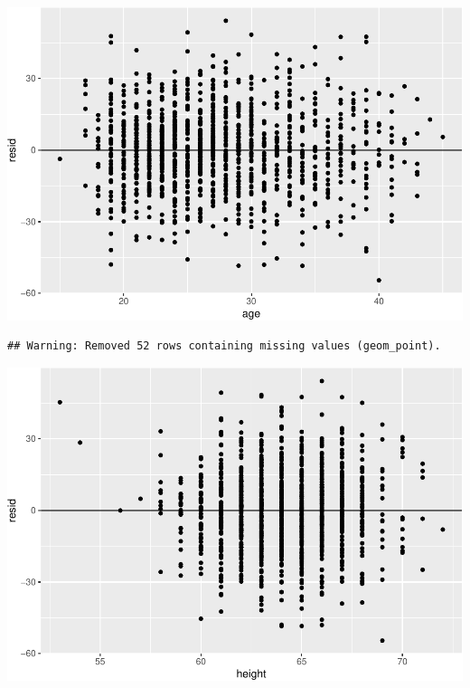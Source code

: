 \documentclass[]{article}
\newenvironment{Shaded}{\begin{snugshade}}{\end{snugshade}}
\newcommand{\DataTypeTok}[1]{\textcolor[rgb]{0.13,0.29,0.53}{#1}}
\newcommand{\DecValTok}[1]{\textcolor[rgb]{0.00,0.00,0.81}{#1}}
\newcommand{\KeywordTok}[1]{\textcolor[rgb]{0.13,0.29,0.53}{\textbf{#1}}}
\newcommand{\NormalTok}[1]{#1}
\newcommand{\OperatorTok}[1]{\textcolor[rgb]{0.81,0.36,0.00}{\textbf{#1}}}
\newcommand{\StringTok}[1]{\textcolor[rgb]{0.31,0.60,0.02}{#1}}
\begin{document}
\includegraphics{lab-8-regression_files/figure-latex/unnamed-chunk-20-1.pdf}

\begin{Shaded}
\end{Shaded}

\begin{verbatim}
## Warning: Removed 52 rows containing missing values (geom_point).
\end{verbatim}

\includegraphics{lab-8-regression_files/figure-latex/unnamed-chunk-21-1.pdf}
\end{document}
